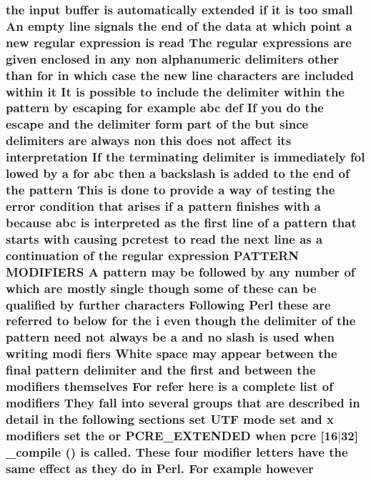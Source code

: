 \subsubsection[{\texorpdfstring{however}{however}}]{\setlength{\rightskip}{0pt plus 5cm}the {\bf input} {\bf buffer} {\bf is} automatically extended {\bf if} {\bf it} {\bf is} too small An {\bf empty} {\bf line} signals the {\bf end} {\bf of} the {\bf data} at {\bf which} {\bf point} {\bf a} new regular {\bf expression} {\bf is} {\bf read} The regular {\bf expressions} {\bf are} {\bf given} enclosed {\bf in} {\bf any} non {\bf alphanumeric} delimiters other {\bf than} for {\bf in} {\bf which} {\bf case} the new {\bf line} {\bf characters} {\bf are} {\bf included} within {\bf it} It {\bf is} {\bf possible} {\bf to} {\bf include} the delimiter within the {\bf pattern} by escaping for {\bf example} {\bf abc} def If you {\bf do} the escape and the delimiter form part {\bf of} the but since delimiters {\bf are} always non {\bf this} does {\bf not} affect its interpretation If the terminating delimiter {\bf is} immediately fol lowed by {\bf a} for {\bf abc} then {\bf a} {\bf backslash} {\bf is} added {\bf to} the {\bf end} {\bf of} the {\bf pattern} This {\bf is} {\bf done} {\bf to} provide {\bf a} {\bf way} {\bf of} testing the {\bf error} condition that {\bf arises} {\bf if} {\bf a} {\bf pattern} finishes {\bf with} {\bf a} because {\bf abc} {\bf is} interpreted {\bf as} the {\bf first} {\bf line} {\bf of} {\bf a} {\bf pattern} that starts {\bf with} causing {\bf pcretest} {\bf to} {\bf read} the next {\bf line} {\bf as} {\bf a} continuation {\bf of} the regular {\bf expression} P\+A\+T\+T\+E\+RN M\+O\+D\+I\+F\+I\+E\+RS {\bf A} {\bf pattern} may {\bf be} followed by {\bf any} {\bf number} {\bf of} {\bf which} {\bf are} mostly single {\bf though} some {\bf of} these {\bf can} {\bf be} qualified by further {\bf characters} Following {\bf Perl} these {\bf are} referred {\bf to} {\bf below} for the {\bf i} even {\bf though} the delimiter {\bf of} the {\bf pattern} need {\bf not} always {\bf be} {\bf a} and no {\bf slash} {\bf is} {\bf used} when writing modi fiers White {\bf space} may appear between the final {\bf pattern} delimiter and the {\bf first} and between the {\bf modifiers} {\bf themselves} For refer {\bf here} {\bf is} {\bf a} complete {\bf list} {\bf of} {\bf modifiers} They fall into several groups that {\bf are} described {\bf in} detail {\bf in} the following sections {\bf set} U\+TF {\bf mode} {\bf set} and {\bf x} {\bf modifiers} {\bf set} the {\bf or} {\bf P\+C\+R\+E\+\_\+\+E\+X\+T\+E\+N\+D\+ED} when {\bf pcre} \mbox{[}16$\vert$32\mbox{]} {\bf \+\_\+compile} () {\bf is} called. These four {\bf modifier} letters have the same effect {\bf as} they {\bf do} {\bf in} Perl. For {\bf example} however}\hypertarget{pcretest_8txt_ac32d00bbb6f5e1481d9db9ecf79e8cd5}{}\label{pcretest_8txt_ac32d00bbb6f5e1481d9db9ecf79e8cd5}
